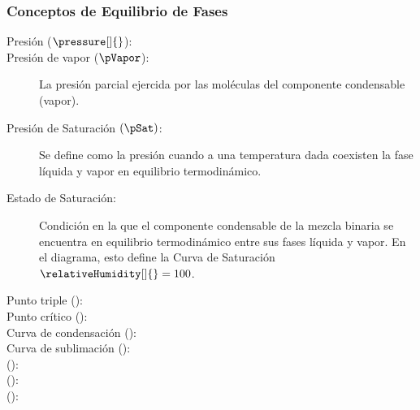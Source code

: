 \subsubsection{Conceptos de Equilibrio de Fases}
    \begin{description}
        \item[Presión (${\pressure[]{}}$):] 
        \item[Presión de vapor ($\pVapor$):] La presión parcial ejercida por las moléculas del componente condensable (vapor).
        \item[Presión de Saturación $(\pSat)$:] Se define como la presión cuando a una temperatura dada coexisten la fase líquida y vapor en equilibrio termodinámico. 
        \item[Estado de Saturación:] Condición en la que el componente condensable de la mezcla binaria se encuentra en equilibrio termodinámico entre sus fases líquida y vapor. En el diagrama, esto define la Curva de Saturación $\relativeHumidity[]{} = 100$. 
        \item[Punto triple (${}$):]
        \item[Punto crítico (${}$):]
        \item[Curva de condensación (${}$):]
        \item[Curva de sublimación (${}$):]
        \item[ (${}$):]
        \item[ (${}$):]
        \item[ (${}$):]
    \end{description}



